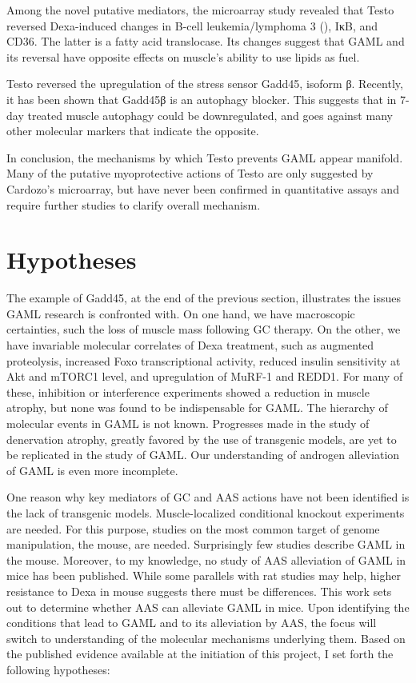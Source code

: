 \documentclass[12pt,english]{report}\usepackage[]{graphicx}\usepackage[]{color}
\begin{document}
Among the novel putative mediators, the microarray study revealed
that Testo reversed Dexa-induced changes in B-cell leukemia/lymphoma
3 (), IκB, and CD36.
The latter is a fatty acid translocase. Its changes suggest that GAML
and its reversal have opposite effects on muscle's ability to use
lipids as fuel\citep{mcfarlan2012vivo}.

Testo reversed the upregulation of the stress sensor Gadd45, isoform
β. Recently, it has been shown that Gadd45β is an autophagy blocker\citep{keil2013phosphorylation}.
This suggests that in 7-day treated muscle autophagy could be downregulated,
and goes against many other molecular markers that indicate the opposite.

In conclusion, the mechanisms by which Testo prevents GAML appear
manifold. Many of the putative myoprotective actions of Testo are
only suggested by Cardozo's microarray, but have never been confirmed
in quantitative assays and require further studies to clarify overall
mechanism.

\begin{singlespace}
\pagebreak{}
\end{singlespace}


\chapter{Hypotheses}

The example of Gadd45, at the end of the previous section, illustrates
the issues GAML research is confronted with. On one hand, we have
macroscopic certainties, such the loss of muscle mass following GC
therapy. On the other, we have invariable molecular correlates of
Dexa treatment, such as augmented proteolysis, increased Foxo transcriptional
activity, reduced insulin sensitivity at Akt and mTORC1 level, and
upregulation of MuRF-1 and REDD1. For many of these, inhibition or
interference experiments showed a reduction in muscle atrophy, but
none was found to be indispensable for GAML. The hierarchy of molecular
events in GAML is not known. Progresses made in the study of denervation
atrophy, greatly favored by the use of transgenic models, are yet
to be replicated in the study of GAML. Our understanding of androgen
alleviation of GAML is even more incomplete.

One reason why key mediators of GC and AAS actions have not been identified
is the lack of transgenic models. Muscle-localized conditional knockout
experiments are needed. For this purpose, studies on the most common
target of genome manipulation, the mouse, are needed. Surprisingly
few studies describe GAML in the mouse. Moreover, to my knowledge,
no study of AAS alleviation of GAML in mice has been published. While
some parallels with rat studies may help, higher resistance to Dexa
in mouse suggests there must be differences. This work sets out to
determine whether AAS can alleviate GAML in mice. Upon identifying
the conditions that lead to GAML and to its alleviation by AAS, the
focus will switch to understanding of the molecular mechanisms underlying
them. Based on the published evidence available at the initiation
of this project, I set forth the following hypotheses:
\end{document}
